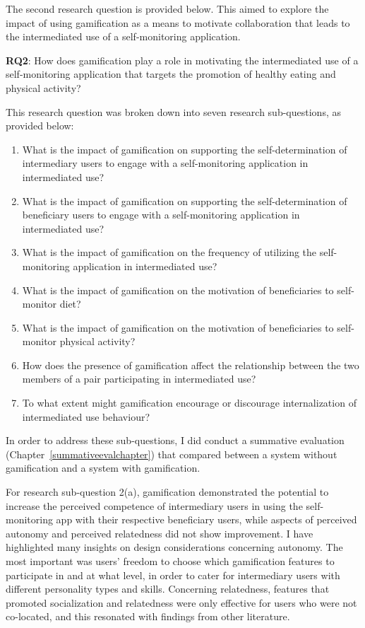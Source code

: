The second research question is provided below. This aimed to explore the impact of using gamification as a means to motivate collaboration that leads to the intermediated use of a self-monitoring application.

\textbf{RQ2}: How does gamification play a role in motivating the intermediated use of a self-monitoring application that targets the promotion of healthy eating and physical activity?

This research question was broken down into seven research sub-questions, as provided below:

\begin{enumerate}[label=\alph*.]
\item What is the impact of gamification on supporting the self-determination of intermediary users to engage with a self-monitoring application in intermediated use?
\item What is the impact of gamification on supporting the self-determination of beneficiary users to engage with a self-monitoring application in intermediated use?
\item What is the impact of gamification on the frequency of utilizing the self-monitoring application in intermediated use?
\item What is the impact of gamification on the motivation of beneficiaries to self-monitor diet?
\item What is the impact of gamification on the motivation of beneficiaries to self-monitor physical activity?
\item How does the presence of gamification affect the relationship between the two members of a pair participating in intermediated use?
\item To what extent might gamification encourage or discourage internalization of intermediated use behaviour?
\end{enumerate}

In order to address these sub-questions, I did conduct a summative evaluation (Chapter~\ref{summativeevalchapter}) that compared between a system without gamification and a system with gamification. 

For research sub-question 2(a), gamification demonstrated the potential to increase the perceived competence of intermediary users in using the self-monitoring app with their respective beneficiary users, while aspects of perceived autonomy and perceived relatedness did not show improvement. I have highlighted many insights on design considerations concerning autonomy. The most important was users' freedom to choose which gamification features to participate in and at what level, in order to cater for intermediary users with different personality types and skills. Concerning relatedness, features that promoted socialization and relatedness were only effective for users who were not co-located, and this resonated with findings from other literature. 


